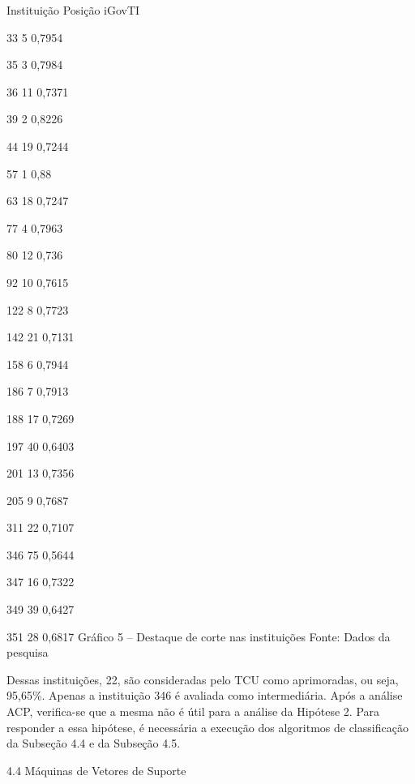 Instituição
Posição
iGovTI 

33
5
0,7954

35
3
0,7984

36
11
0,7371

39
2
0,8226

44
19
0,7244

57
1
0,88

63
18
0,7247

77
4
0,7963

80
12
0,736

92
10
0,7615

122
8
0,7723

142
21
0,7131

158
6
0,7944

186
7
0,7913

188
17
0,7269

197
40
0,6403

201
13
0,7356

205
9
0,7687

311
22
0,7107

346
75
0,5644

347
16
0,7322

349
39
0,6427

351
28
0,6817
Gráfico 5 – Destaque de corte nas instituições 
Fonte: Dados da pesquisa

Dessas instituições, 22, são consideradas pelo TCU como aprimoradas, ou seja, 95,65\%. Apenas a instituição 346 é avaliada como intermediária.
Após a análise ACP, verifica-se que a mesma não é útil para a análise da Hipótese 2. Para responder a essa hipótese, é necessária a execução dos algoritmos de classificação da Subseção 4.4 e da Subseção 4.5.

4.4 Máquinas de Vetores de Suporte

